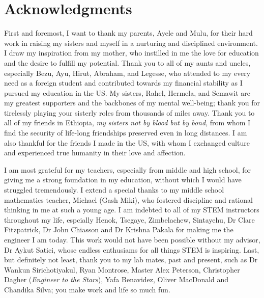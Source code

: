 \chapter*{Acknowledgments}

First and foremost, I want to thank my parents, Ayele and Mulu, for their hard
work in raising my sisters and myself in a nurturing and disciplined
environment.
%
I draw my inspiration from my mother, who instilled in me the love for education
and the desire to fulfill my potential. 
%
Thank you to all of my aunts and uncles, especially Bezu, Ayu, Hirut, Abraham,
and Legesse, who attended to my every need as a foreign student and contributed
towards my financial stability as I pursued my education in the US.  
%
My sisters, Rahel, Hermela, and Semawit are my greatest supporters and the
backbones of my mental well-being; thank you for tirelessly playing your
sisterly roles from thousands of miles away.
%
Thank you to all of my friends in Ethiopia, \textit{my sisters not by blood but by
bond}, from whom I find the security of life-long friendships preserved even in
long distances.
%
I am also thankful for the friends I made in the US, with whom I exchanged
culture and experienced true humanity in their love and affection. 



I am most grateful for my teachers, especially from middle and high school, for
giving me a strong foundation in my education, without which I would have
struggled tremendously.
%  
I extend a special thanks to my middle school mathematics teacher, Michael (Gash
Miki), who fostered discipline and rational thinking in me at such a young age.
%
I am indebted to all of my STEM instructors throughout my life, espcially Henok,
Tsegaye, Zimbelachew, Sintayehu, Dr Clare Fitzpatrick, Dr John Chiasson and Dr
Krishna Pakala for making me the engineer I am today.
%
This work would not have been possible without my advisor, Dr Aykut Satici,
whose endless enthusiams for all things STEM is inspiring.
%
Last, but definitely not least, thank you to my lab mates, past and present,
such as Dr Wankun Sirichotiyakul, Ryan Montrose, Master Alex Peterson,
Christopher Dagher (\textit{Engineer to the Stars}), Yafa Benavidez, Oliver
MacDonald and Chandika Silva; you make work and life so much fun.

